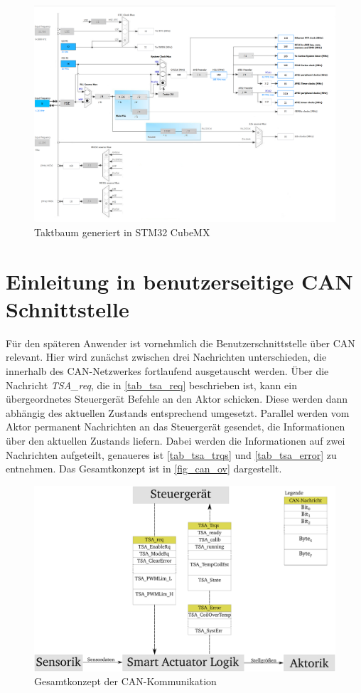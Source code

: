 \begin{figure}%
\includegraphics[width=\columnwidth]{./Bilder/fig_clock}%
\caption{Taktbaum generiert in STM32 CubeMX}%
\label{fig_clock}%
\end{figure}

\section{Einleitung in benutzerseitige CAN Schnittstelle} \label{CANNachrichten}

Für den späteren Anwender ist vornehmlich die Benutzerschnittstelle über CAN relevant. Hier wird zunächst zwischen drei Nachrichten unterschieden, die innerhalb des CAN-Netzwerkes fortlaufend ausgetauscht werden. Über die Nachricht \textit{TSA\_req}, die in \autoref{tab_tsa_req} beschrieben ist, kann ein übergeordnetes Steuergerät Befehle an den Aktor schicken. Diese werden dann abhängig des aktuellen Zustands entsprechend umgesetzt. Parallel werden vom Aktor permanent Nachrichten an das Steuergerät gesendet, die Informationen über den aktuellen Zustands liefern. Dabei werden die Informationen auf zwei Nachrichten aufgeteilt, genaueres ist \autoref{tab_tsa_trqs} und \autoref{tab_tsa_error} zu entnehmen. Das Gesamtkonzept ist in \autoref{fig_can_ov} dargestellt.

\begin{figure}[h]%
\centering
\includegraphics[width=0.8\columnwidth]{./Bilder/fig_can_ov}%
\caption{Gesamtkonzept der CAN-Kommunikation}%
\label{fig_can_ov}%
\end{figure}

